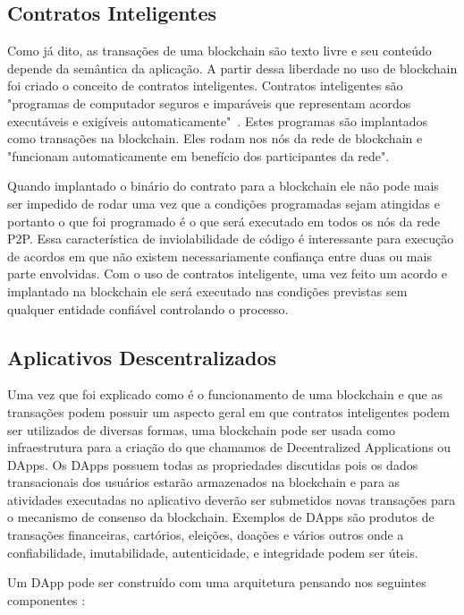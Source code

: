 \documentclass[12pt]{article}
\begin{document}
\subsection{Contratos Inteligentes}

Como já dito, as transações de uma blockchain são texto livre e seu conteúdo depende da semântica da aplicação. A partir dessa liberdade no uso de blockchain foi criado o conceito de contratos inteligentes. Contratos inteligentes são "programas de computador seguros e imparáveis que representam acordos executáveis e exigíveis automaticamente"~\cite{braga2017segurancca}. Estes programas são implantados como transações na blockchain. Eles rodam nos nós da rede de blockchain e "funcionam automaticamente em benefício dos participantes da rede"\cite{braga2017segurancca}. 

Quando implantado o binário do contrato para a blockchain ele não pode mais ser impedido de rodar uma vez que a condições programadas sejam atingidas e portanto o que foi programado é o que será executado em todos os nós da rede P2P. Essa característica de inviolabilidade de código é interessante para execução de acordos em que não existem necessariamente confiança entre duas ou mais parte envolvidas. Com o uso de contratos inteligente, uma vez feito um acordo e implantado na blockchain ele será executado nas condições previstas sem qualquer entidade confiável controlando o processo.

\subsection{Aplicativos Descentralizados}

Uma vez que foi explicado como é o funcionamento de uma blockchain e que as transações podem possuir um aspecto geral em que contratos inteligentes podem ser utilizados de diversas formas, uma blockchain pode ser usada como infraestrutura para a criação do que chamamos de Decentralized Applications ou DApps. Os DApps possuem todas as propriedades discutidas pois os dados transacionais dos usuários estarão armazenados na blockchain e para as atividades executadas no aplicativo deverão ser submetidos novas transações para o mecanismo de consenso da blockchain. Exemplos de DApps são produtos de transações financeiras, cartórios, eleições, doações e vários outros onde a confiabilidade, imutabilidade, autenticidade, e integridade podem ser úteis.

Um DApp pode ser construído com uma arquitetura pensando nos seguintes componentes \cite{braga2017segurancca}:
\end{document}
